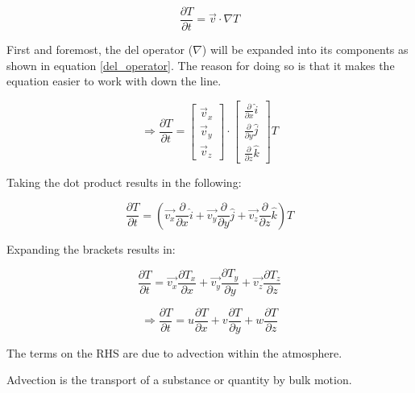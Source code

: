 \begin{equation}
    \frac{\partial T}{\partial t} = \Vec{v} \cdot \nabla T
\end{equation}

First and foremost, the del operator ($\nabla$) will be expanded into its components as shown in equation \ref{del_operator}. The reason for doing so is that it makes the equation easier to work with down the line.

\begin{equation}
    \Rightarrow \frac{\partial T}{\partial t} = \begin{bmatrix} \Vec{v}_x \\ \Vec{v}_y \\ \Vec{v}_z \end{bmatrix} \cdot \begin{bmatrix} \frac{\partial}{\partial x} \hat{i} \\ \frac{\partial}{\partial y} \hat{j} \\ \frac{\partial}{\partial z} \hat{k} \end{bmatrix} T
    \label{del_operator}
\end{equation}

Taking the dot product results in the following:

\begin{equation}
     \frac{\partial T}{\partial t} = (\Vec{v_{x}} \frac{\partial}{\partial x} \hat{i} + \Vec{v_{y}} \frac{\partial}{\partial y} \hat{j} + \Vec{v_{z}} \frac{\partial}{\partial z} \hat{k}) T
\end{equation}

Expanding the brackets results in:

\begin{equation}
     \frac{\partial T}{\partial t} = \Vec{v_{x}} \frac{\partial T_{x}}{\partial x} + \Vec{v_{y}} \frac{\partial T_{y}}{\partial y} + \Vec{v_{z}} \frac{\partial T_{z}}{\partial z} 
\end{equation}

\begin{equation}
    \Rightarrow \frac{\partial T}{\partial t} = u \frac{\partial T}{\partial x} + v \frac{\partial T}{\partial y} + w \frac{\partial T}{\partial z}
    \label{analytic_temp_final}
\end{equation}

The terms on the RHS are due to advection within the atmosphere.

\begin{definition}
Advection is the transport of a substance or quantity by bulk motion.
\end{definition}

